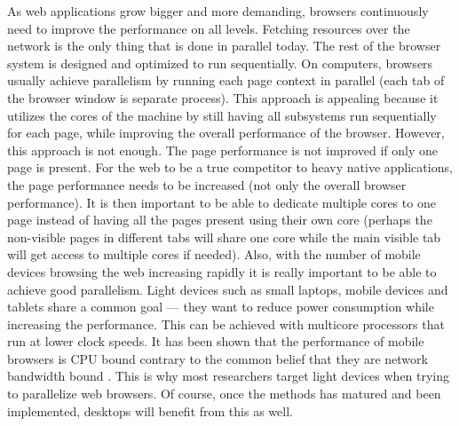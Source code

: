 \documentclass[a4paper,11pt]{kth-mag}
\begin{document}
        As \gls{web} applications grow bigger and more demanding, \glspl{browser} continuously need to improve the performance on all levels.
        Fetching resources over the network is the only thing that is done in parallel today.
        The rest of the \gls{browser} system is designed and optimized to run sequentially.
        On computers, \glspl{browser} usually achieve parallelism by running each page context in parallel (each tab of the \gls{browser} window is separate process).
        This approach is appealing because it utilizes the cores of the machine by still having all subsystems run sequentially for each page, while improving the overall performance of the \gls{browser}.
        However, this approach is not enough.
        The page performance is not improved if only one page is present.
        For the \gls{web} to be a true competitor to heavy native applications, the page performance needs to be increased (not only the overall \gls{browser} performance).
        It is then important to be able to dedicate multiple cores to one page instead of having all the pages present using their own core (perhaps the non-visible pages in different tabs will share one core while the main visible tab will get access to multiple cores if needed).
        Also, with the number of mobile devices browsing the \gls{web} increasing rapidly it is really important to be able to achieve good parallelism.
        Light devices such as small laptops, mobile devices and tablets share a common goal --- they want to reduce power consumption while increasing the performance.
        This can be achieved with multicore processors that run at lower clock speeds.
        It has been shown that the performance of mobile \glspl{browser} is \gls{CPU} bound contrary to the common belief that they are network bandwidth bound \cite{parallelizing_the_web_browser}.
        This is why most researchers target light devices when trying to parallelize \gls{web} \glspl{browser}.
        Of course, once the methods has matured and been implemented, desktops will benefit from this as well.
\end{document}
